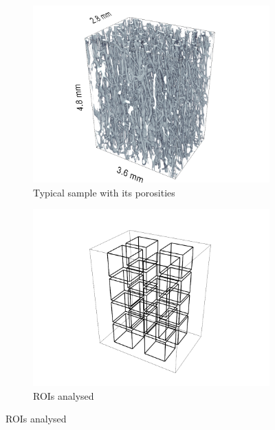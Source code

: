 \documentclass[a4paper,fleqn]{DC_ArtStyle}
\begin{document}
	\begin{figure}[!h]
		\centering
		\begin{subfigure}[t]{.45\linewidth}
			\includegraphics[height=0.8\linewidth]{../_Results/Scans/2009_213_L}
			\caption{Typical sample with its porosities}
		\end{subfigure}
		\begin{subfigure}[t]{0.45\linewidth}
			\includegraphics[height=0.8\linewidth, trim=50 50 50 0]{../_Results/ROIs/ROIs}
			\caption{ROIs analysed}
		\end{subfigure}
	\end{figure}
\end{document}
